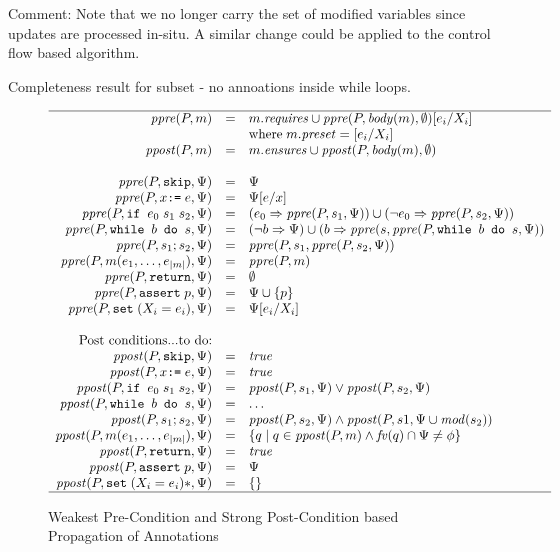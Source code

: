 \documentclass[10pt,notitlepage,twoside]{article}
\newcommand{\ppre}{\mathit{ppre}}
\newcommand{\ppost}{\mathit{ppost}}
\newcommand{\mod}{\mathit{mod}}
\newcommand{\fv}{\mathit{fv}}
\newcommand{\true}{\mathit{true}}
\begin{document}
Comment: Note that we no longer carry the set of modified variables since updates are processed in-situ. A similar change could be applied to the control flow based algorithm.

Completeness result for subset - no annoations inside while loops.



\begin{figure}[tbp]
\begin{displaymath}
\begin{array}{rcl}
\hline 
\ppre(P,m) & = & m.\mathit{requires} \cup \ppre(P,\mathit{body}(m),\emptyset)[e_i/X_i]  \\
& & \mbox{where}\; m.\mathit{preset} = [e_i/X_i] \\
\ppost(P,m) & = & m.\mathit{ensures} \cup \ppost(P,\mathit{body}(m),\emptyset) \\
\ \\
\ppre(P,\texttt{skip},\Psi) & = & \Psi  \\
\ppre(P,x \texttt{:=}\; e,\Psi) & = & \Psi[e/x] \\
\ppre(P,\texttt{if }e_0\;s_1\;s_2,\Psi) & = & (e_0 \Rightarrow \ppre(P,s_1,\Psi)) \cup (\neg e_0 \Rightarrow \ppre(P,s_2,\Psi)) \\
\ppre(P,\texttt{while }b\texttt{ do }s,\Psi) & = & (\neg b \Rightarrow \Psi) \cup (b \Rightarrow \ppre(s,\ppre(P,\texttt{while }b\texttt{ do }s,\Psi))   \\
\ppre(P,s_1; s_2,\Psi) & = & \ppre(P,s_1,\ppre(P,s_2,\Psi))  \\
\ppre(P,m(e_1,\ldots,e_{|m|}),\Psi) & = & \ppre(P,m)  \\
\ppre(P,\texttt{return},\Psi) & = & \emptyset  \\
\ppre(P,\texttt{assert}\;p,\Psi) & = & \Psi \cup \{ p \} \\
\ppre(P,\texttt{set}\;(X_i = e_i),\Psi) & = & \Psi[e_i/X_i] \\
\ \\
\mbox{Post conditions...to do:}\\
\ppost(P,\texttt{skip},\Psi) & = & \true  \\
\ppost(P,x \texttt{:=}\; e,\Psi) & = & \true \\
\ppost(P,\texttt{if }e_0\;s_1\;s_2,\Psi) & = & \ppost(P,s_1,\Psi) \vee \ppost(P,s_2,\Psi) \\
\ppost(P,\texttt{while }b\texttt{ do }s,\Psi) & = & \ldots    \\
\ppost(P,s_1; s_2,\Psi) & = & \ppost(P,s_2,\Psi) \wedge \ppost(P,s1,\Psi\cup\mod(s_2))  \\
\ppost(P,m(e_1,\ldots,e_{|m|}),\Psi) & = & \{ q \mid q \in \ppost(P,m) \wedge \fv(q) \cap \Psi \neq \phi   \}\\
\ppost(P,\texttt{return},\Psi) & = & \true \\
\ppost(P,\texttt{assert}\;p,\Psi) & = & \Psi \\
\ppost(P,\texttt{set}\;(X_i = e_i)*,\Psi) & = & \{ \}  \\
\hline
\end{array}
\end{displaymath}
\caption{Weakest Pre-Condition and Strong Post-Condition based Propagation of Annotations}\label{fig:wp-propagation}
\end{figure}
\end{document}
